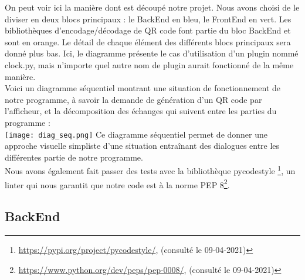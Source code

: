 \documentclass[a4paper,12pt]{article}
\begin{document}
\noindent On peut voir ici la manière dont est découpé notre projet. Nous avons choisi de le diviser en deux blocs principaux : le BackEnd en bleu, le FrontEnd en vert. Les bibliothèques d'encodage/décodage de QR code font partie du bloc BackEnd et sont en orange. Le détail de chaque élément des différents blocs principaux sera donné plus bas. Ici, le diagramme présente le cas d'utilisation d'un plugin nommé clock.py, mais n'importe quel autre nom de plugin aurait fonctionné de la même manière.\\

\noindent Voici un diagramme séquentiel montrant une situation de fonctionnement de notre programme, à savoir la demande de génération d'un QR code par l'afficheur, et la décomposition des échanges qui suivent entre les parties du programme :\\
\noindent\texttt{[image: diag\_seq.png]} 
Ce diagramme séquentiel permet de donner une approche visuelle simpliste d'une situation entraînant des dialogues entre les différentes partie de notre programme.\\

\noindent Nous avons également fait passer des tests avec la bibliothèque pycodestyle \footnote{\url{https://pypi.org/project/pycodestyle/}, (consulté le 09-04-2021)}, un linter qui nous garantit que notre code est à la norme PEP 8\footnote{\url{https://www.python.org/dev/peps/pep-0008/}, (consulté le 09-04-2021)}.

\newpage
\subsection{BackEnd}
\label{backend}
\end{document}
